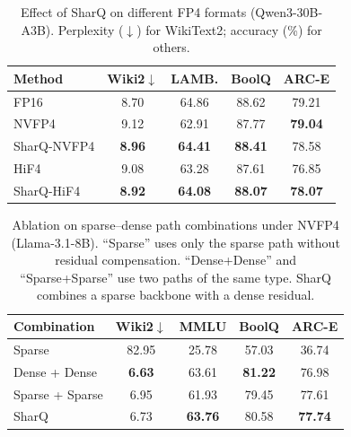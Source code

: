 \documentclass{article}
\begin{document}
\begin{table}[t]
\caption{Effect of SharQ on different FP4 formats (Qwen3-30B-A3B).
Perplexity ($\downarrow$) for WikiText2; accuracy (\%) for others.}
\label{tab:ablation-format}
\centering
\small
\begin{tabular}{@{}l|cccc@{}}
\toprule
Method & Wiki2$\downarrow$ & LAMB. & BoolQ & ARC-E \\
\midrule
FP16       & 8.70 & 64.86 & 88.62 & 79.21 \\
\midrule
NVFP4      & 9.12 & 62.91 & 87.77 & \textbf{79.04} \\
SharQ-NVFP4 & \textbf{8.96} & \textbf{64.41} & \textbf{88.41} & 78.58 \\
\midrule
HiF4       & 9.08 & 63.28 & 87.61 & 76.85 \\
SharQ-HiF4 & \textbf{8.92} & \textbf{64.08} & \textbf{88.07} & \textbf{78.07} \\
\bottomrule
\end{tabular}
\end{table}

\begin{table}[t]
\caption{Ablation on sparse--dense path combinations under NVFP4
(Llama-3.1-8B). ``Sparse'' uses only the sparse path without residual
compensation. ``Dense+Dense'' and ``Sparse+Sparse'' use two paths of the
same type. SharQ combines a sparse backbone with a dense residual.}
\label{tab:ablation-combination}
\centering
\small
\begin{tabular}{@{}l|cccc@{}}
\toprule
Combination & Wiki2$\downarrow$ & MMLU & BoolQ & ARC-E \\
\midrule
Sparse          & 82.95 & 25.78 & 57.03 & 36.74 \\
Dense + Dense   &  \textbf{6.63} & 63.61 & \textbf{81.22} & 76.98 \\
Sparse + Sparse &  6.95 & 61.93 & 79.45 & 77.61 \\
SharQ           &  6.73 & \textbf{63.76} & 80.58 & \textbf{77.74} \\
\bottomrule
\end{tabular}
\end{table}
\end{document}
